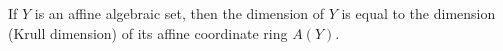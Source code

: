 If $Y$ is an affine algebraic set, then the dimension of $Y$ is equal to the dimension (Krull dimension) of its affine coordinate ring $A(Y)$.
